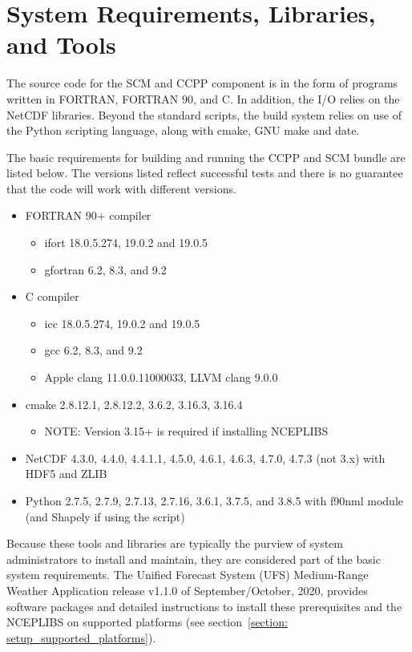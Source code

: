 \section{System Requirements, Libraries, and Tools}
\label{section: systemrequirements}

The source code for the SCM and CCPP component is in the form of programs written in FORTRAN, FORTRAN 90, and C. In addition, the I/O relies on the NetCDF libraries. Beyond the standard scripts, the build system relies on use of the Python scripting language, along with cmake, GNU make and date.

The basic requirements for building and running the CCPP and SCM bundle are listed below. The versions listed reflect successful tests and there is no guarantee that the code will work with different versions.
\begin{itemize}
    \item FORTRAN 90+ compiler
    	\begin{itemize}
   	 \item ifort 18.0.5.274, 19.0.2 and 19.0.5
	 \item gfortran 6.2, 8.3, and 9.2
	 \end{itemize}
    \item C compiler
    	\begin{itemize}
	\item icc 18.0.5.274, 19.0.2 and 19.0.5
	\item gcc 6.2, 8.3, and 9.2
	\item Apple clang 11.0.0.11000033, LLVM clang 9.0.0
	\end{itemize}
    \item cmake 2.8.12.1, 2.8.12.2, 3.6.2, 3.16.3, 3.16.4
    	\begin{itemize}
	\item NOTE: Version 3.15+ is required if installing NCEPLIBS
	\end{itemize}
   	 \item NetCDF 4.3.0, 4.4.0, 4.4.1.1, 4.5.0, 4.6.1, 4.6.3, 4.7.0, 4.7.3 (not 3.x) with HDF5 and ZLIB
    \item Python 2.7.5, 2.7.9, 2.7.13, 2.7.16, 3.6.1, 3.7.5, and 3.8.5 with f90nml module (and Shapely if using the  script)
\end{itemize}

Because these tools and libraries are typically the purview of system administrators to install and maintain, they are considered  part of the basic system requirements. The Unified Forecast System (UFS) Medium-Range Weather Application release v1.1.0 of September/October, 2020, provides software packages and detailed instructions to install these prerequisites and the NCEPLIBS on supported platforms (see section~\ref{section: setup_supported_platforms}).

